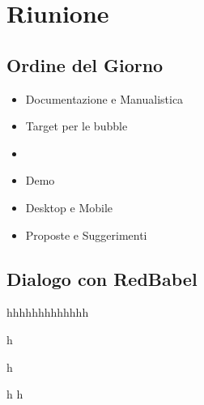 \section{Riunione}
\subsection{Ordine del Giorno}

\begin{itemize}
	\item Documentazione e Manualistica
	\item Target per le bubble
	\item {}
	\item Demo
	\item Desktop e Mobile
	\item Proposte e Suggerimenti
\end{itemize}

\subsection{Dialogo con RedBabel}
hhhhhhhhhhhhh




h


h

h
h
\clearpage